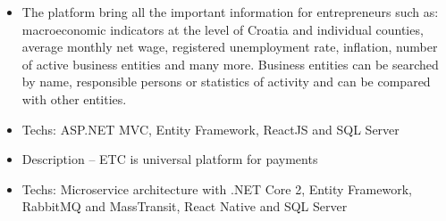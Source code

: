 \documentclass[10pt,a4paper]{altacv}
\begin{document}
\medskip





\begin{itemize}
  \item \small{The platform bring all the important information for entrepreneurs such as: macroeconomic indicators at the level of Croatia and individual counties, average monthly net wage, registered unemployment rate, inflation, number of active business entities and many more. Business entities can be searched by name, responsible persons or statistics of activity and can be compared with other entities.}
  \item Techs: ASP.NET MVC, Entity Framework, ReactJS and SQL Server
\end{itemize}

\divider

%



\begin{itemize}
  \item Description -- ETC is universal platform for payments
  \item Techs: Microservice architecture with .NET Core 2, Entity Framework, RabbitMQ and MassTransit, React Native and SQL Server 
\end{itemize}




\divider


\divider






\end{document}
